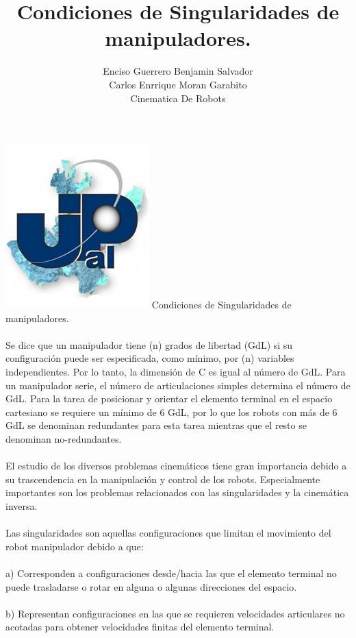 \documentclass[12pt,a4paper]{article}
\author{Enciso Guerrero Benjamin Salvador\\
Carlos Enrrique Moran Garabito\\
Cinematica De Robots }
\title{Condiciones de Singularidades de manipuladores.}
\begin{document}
\maketitle
\includegraphics[scale=1.8]{upzmgg.jpg} 
\newpage
Condiciones de Singularidades de manipuladores.
\\\\
Se dice que un manipulador tiene (n) grados de libertad (GdL) si su configuración puede ser especificada, como mínimo, por (n) variables independientes. Por lo tanto, la dimensión de C es igual al número de GdL. Para un manipulador serie, el número de articulaciones simples determina el número de GdL. Para la tarea de posicionar y orientar el elemento terminal en el espacio cartesiano se requiere un mínimo de 6 GdL, por lo que los robots con más de 6 GdL se denominan redundantes para esta tarea mientras que el resto se denominan no-redundantes. 
\\\\
El estudio de los diversos problemas cinemáticos tiene gran importancia debido a su trascendencia en la manipulación y control de los robots. Especialmente importantes son los problemas relacionados con las singularidades y la cinemática inversa. 
\\\\
Las singularidades son aquellas configuraciones que limitan el movimiento del robot manipulador debido a que: 
\\\\
a) Corresponden a configuraciones desde/hacia las que el elemento terminal no puede trasladarse o rotar en alguna o algunas direcciones del espacio. 
\\\\
b) Representan configuraciones en las que se requieren velocidades articulares no acotadas para obtener velocidades finitas del elemento terminal.
\\\\
\end{document}
